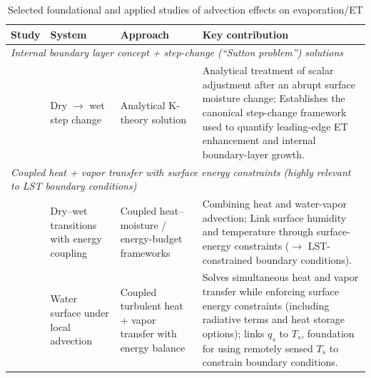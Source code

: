 \documentclass{article}
\begin{document}
    
    
    
    
    \begin{table}[htbp]
    \centering
    \caption{Selected foundational and applied studies of advection effects on evaporation/ET}
    \renewcommand{\arraystretch}{1.15}
    \label{tab:advection_studies_foundational}
    \begin{tabular}{|p{2.7cm}|p{3.2cm}|p{2.9cm}|p{6.0cm}|}
    \label{tab:advection_studies_brutsaert}\\
    \hline
    \textbf{Study} & \textbf{System } & \textbf{Approach} & \textbf{Key contribution} \\
    \hline
    \multicolumn{4}{|l|}{\textit{Internal boundary layer concept + step-change (``Sutton problem'') solutions}} \\
    \hline
    \citet{sutton1934wind} & Dry $\rightarrow$ wet step change & Analytical K-theory solution & Analytical treatment of scalar adjustment after an abrupt surface moisture change; 
    Establishes the canonical step-change framework used to quantify leading-edge ET enhancement and internal boundary-layer growth. \\
    \hline
    
    \multicolumn{4}{|l|}{\textit{Coupled heat + vapor transfer with surface energy constraints (highly relevant to LST boundary conditions)}} \\
    \hline
    \citet{timofeev1954change} \citet{de1959influence} & Dry--wet transitions with energy coupling 
    & 
    Coupled heat--moisture / energy-budget frameworks &  Combining heat and water-vapor advection; 
    Link surface humidity and temperature through surface-energy constraints ($\rightarrow$ LST-constrained boundary conditions). 
    \\
    \hline
    \citet{yeh1971solution} & Water surface under local advection & Coupled turbulent heat + vapor transfer with energy balance & Solves simultaneous heat and vapor transfer while enforcing surface energy constraints (including radiative terms and heat storage options);  links $q_s$ to $T_s$, foundation for using remotely sensed $T_s$ to constrain boundary conditions. \\
    \hline
    

\end{tabular}
\end{table}
\end{document}
